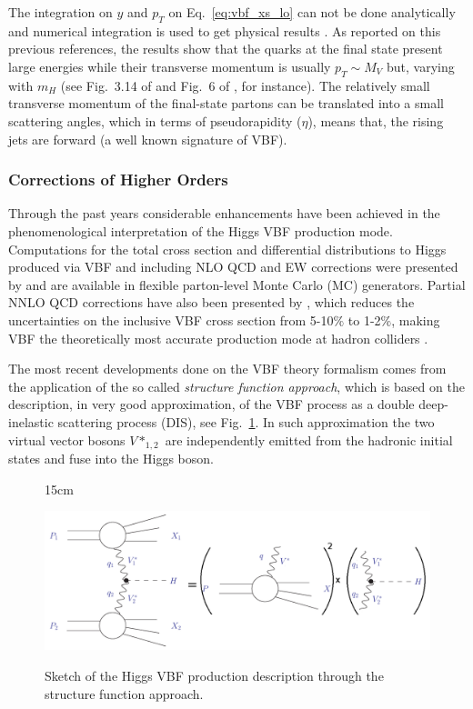 The integration on $y$ and $p_{T}$ on Eq.~\ref{eq:vbf_xs_lo} can not be done analytically and numerical integration is used to get physical results \cite{bib:PhysRep457-1-2005,bib:NuclPhysB287-1987}. As reported on this previous references, the results show that the quarks at the final state present large energies while their transverse momentum is usually $p_{T} \sim M_{V}$ but, varying with $m_{H}$ (see Fig.~3.14 of \cite{bib:PhysRep457-1-2005} and Fig.~6 of \cite{bib:NuclPhysB287-1987}, for instance). The relatively small transverse momentum of the final-state partons can be translated into a small scattering angles, which in terms of pseudorapidity ($\eta$), means that, the rising jets are forward (a well known signature of VBF).


\subsubsection{Corrections of Higher Orders}
Through the past years considerable enhancements have been achieved in the phenomenological interpretation of the Higgs VBF production mode. Computations for the total cross section and differential distributions to Higgs produced via VBF and including NLO QCD and EW corrections were presented by \cite{bib:Phys46-203-1998,bib:PhysRevLett69-3274-1992} and are available in flexible parton-level Monte Carlo (MC) generators. Partial NNLO QCD corrections have also been presented by \cite{bib:PhysRevD77-053010-2008,bib:PhysRevLett105-011801-2010}, which reduces the uncertainties on the inclusive VBF cross section from 5-10$\%$ to 1-2$\%$, making VBF the theoretically most accurate production mode at hadron colliders \cite{bib:ChinPhysC-38-9-2014}. 

The most recent developments done on the VBF theory formalism comes from the application of the so called \textit{structure function approach}, which is based on the description, in very good approximation, of the VBF process as a double deep-inelastic scattering process (DIS), see Fig.~\ref{fig:vbf_DIS_approx}. In such approximation the two virtual vector bosons $V*_{1,2}$ are independently emitted from the hadronic initial states and fuse into the Higgs boson. 

\begin{figure}[htbp]{15cm}
	\caption{Sketch of the Higgs VBF production description through the structure function approach.}
	\includegraphics[scale=0.4]{ChapterTheory/figs/vbf_DIS_approximation}
	\label{fig:vbf_DIS_approx}
\end{figure}

